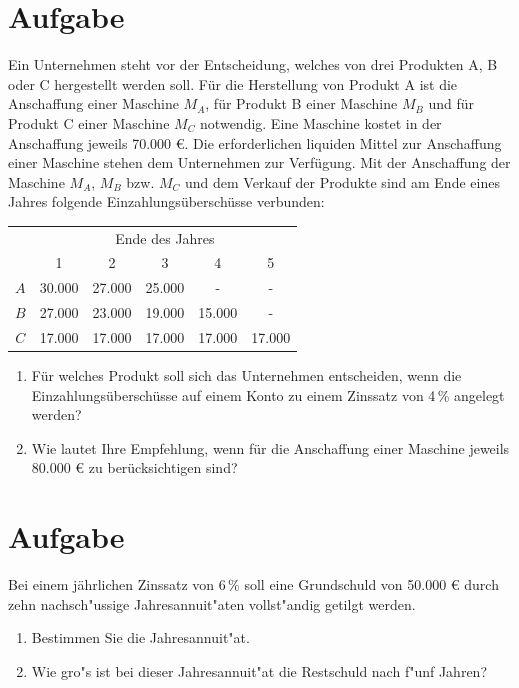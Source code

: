 \documentclass[fontsize=11pt, parskip=half]{scrartcl}
\begin{document}
  
    
    
    \section{Aufgabe} 
    Ein Unternehmen steht vor der Entscheidung, welches von drei
    Produkten A, B oder C hergestellt werden soll. Für die Herstellung
    von Produkt A ist die Anschaffung einer Maschine $M_A$, für Produkt
    B einer Maschine $M_B$ und für Produkt C einer Maschine $M_C$
    notwendig. Eine Maschine kostet in der Anschaffung jeweils 70.000
    €. Die erforderlichen liquiden Mittel zur Anschaffung einer
    Maschine stehen dem Unternehmen zur Verfügung. Mit der Anschaffung
    der Maschine $M_A$, $M_B$ bzw. $M_C$ und dem Verkauf der Produkte
    sind am Ende eines Jahres folgende Einzahlungsüberschüsse verbunden:
    \begin{center}
    \begin{tabular}{|c|c|c|c|c|c|}  \hline
       & \multicolumn{5}{|c|}{Ende des Jahres} \\
      & 1 & 2 & 3 & 4 & 5\\\hline
      $A$ & 30.000  & 27.000  & 25.000  & -       &  -  \\
      $B$ & 27.000  & 23.000  & 19.000  & 15.000  &  -   \\
      $C$ & 17.000  & 17.000  & 17.000  & 17.000  &  17.000   \\  \hline
    \end{tabular}
    \end{center}
    
    \begin{enumerate}
    \item Für welches Produkt soll sich das Unternehmen entscheiden, wenn die
    Einzahlungsüberschüsse auf einem Konto zu einem Zinssatz von 4\,\%
    angelegt werden?
    \item Wie lautet Ihre Empfehlung, wenn für die Anschaffung einer Maschine jeweils 80.000
    € zu berücksichtigen sind?
    \end{enumerate}
    

    
    \section{Aufgabe}
     Bei einem jährlichen Zinssatz von $6\,\%$ soll eine
    Grundschuld von 50.000 € durch zehn nachsch"ussige
    Jahresannuit"aten vollst"andig getilgt werden.
    \begin{enumerate}
    \item Bestimmen Sie die Jahresannuit"at. \item Wie gro"s ist bei
    dieser Jahresannuit"at die Restschuld nach f"unf Jahren?
    \end{enumerate}
\end{document}
